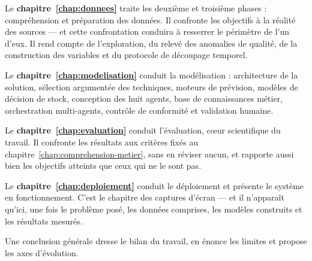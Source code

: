 Le \textbf{chapitre~\ref{chap:donnees}} traite les deuxième et troisième phases : compréhension et préparation des données. Il confronte les objectifs à la réalité des sources — et cette confrontation conduira à resserrer le périmètre de l'un d'eux. Il rend compte de l'exploration, du relevé des anomalies de qualité, de la construction des variables et du protocole de découpage temporel.

Le \textbf{chapitre~\ref{chap:modelisation}} conduit la modélisation : architecture de la solution, sélection argumentée des techniques, moteurs de prévision, modèles de décision de stock, conception des huit agents, base de connaissances métier, orchestration multi-agents, contrôle de conformité et validation humaine.

Le \textbf{chapitre~\ref{chap:evaluation}} conduit l'évaluation, cœur scientifique du travail. Il confronte les résultats aux critères fixés au chapitre~\ref{chap:comprehension-metier}, sans en réviser aucun, et rapporte aussi bien les objectifs atteints que ceux qui ne le sont pas.

Le \textbf{chapitre~\ref{chap:deploiement}} conduit le déploiement et présente le système en fonctionnement. C'est le chapitre des captures d'écran — et il n'apparaît qu'ici, une fois le problème posé, les données comprises, les modèles construits et les résultats mesurés.

Une conclusion générale dresse le bilan du travail, en énonce les limites et propose les axes d'évolution.
